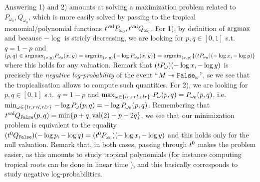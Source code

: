 Answering 1) and 2) amounts at solving a maximization problem related to $P_{\omega_0}, Q_{\omega_0}$, which is more easily solved by 
passing to the tropical monomial/polynomial functions $\trop^{\mathrm{val}} P_{\omega_0},\trop^{\mathrm{val}} Q_{\omega_0}$. 
For 1), by definition of $\mathrm{arg max}$ and because $-\log$ is stricly decreasing, we are looking for $p,q\in[0,1]$ s.t.\ $q=1-p$ and $(p,q)\in
   \RM{arg max}_{(x,y)} P_{\omega_0} (x,y)
   = %
   \RM{arg min}_{(x,y)}\set{-\log P_{\omega_0} (x,y)}
   =%
   \RM{arg min}_{(x,y)}\set{(\trop P_{\omega_0}) (-\log x,-\log y)} \label{eq:argmax}$
where this holds for any valuation.
Remark that $(\trop P_{\omega})( -\log x, -\log y)$ is precisely the \emph{negative log-probability} of the event ``$M\twoheadrightarrow \mathtt{False}_{\omega}$'', se we see that the tropicalisation allows to compute such quantities.
For 2), %
we are looking for $p,q\in[0,1]$ s.t.\ $q=1-p$ and
$\max_{\omega\in\{lr,rrl,rlr\}} \, P_\omega(p,q) = P_{\omega_0}(p,q)$, i.e.\ $\min_{\omega\in\{lr,rrl,rlr\}} \, -\log P_\omega(p,q) = -\log P_{\omega_0}(p,q)$.
Remembering that $\trop^{\mathrm{val}} Q_{\false}(p,q)=\min\set{p+q, \mathrm{val}(2)+p+2q}$, we see that our minimization problem is equivalent to the equality $(\trop^0 Q_{\false})( -\log p, -\log q) = (\trop^0 P_{\omega_0})( -\log x, -\log y)\label{eq:max}$
and this holds only for the null valuation.
Remark that, in both cases, passing through $\trop^0 $ %
makes the problem easier, as this amounts to study tropical polynomials (for instance computing tropical roots can be done in linear time \cite{Noferini2lr5}), and this basically corresponds to study negative log-probabilities. %


